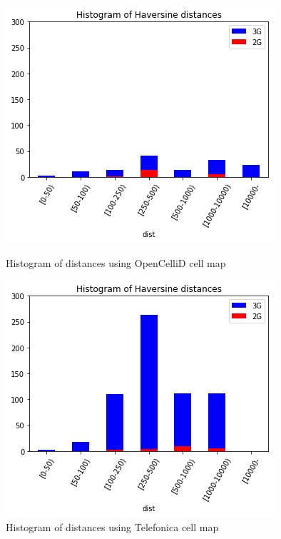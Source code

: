 \begin{figure}[h!]
    \centering
    \begin{minipage}[b]{0.5\textwidth}
        \includegraphics[width=\textwidth]{images/hist_opencell.png}
        \caption{Histogram of distances using OpenCelliD cell map}
        \label{fig:hist_opencell}
    
        \includegraphics[width=\textwidth]{images/hist_tefnext.png}
        \caption{Histogram of distances using Telefonica cell map}
        \label{fig:hist_tefnext}
    \end{minipage}\qquad
\end{figure}

